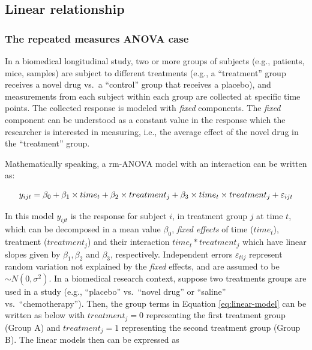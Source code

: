 \documentclass[
]{article}
\begin{document}
\hypertarget{linear-relationship}{%
\subsection{Linear relationship}\label{linear-relationship}}

\hypertarget{the-repeated-measures-anova-case}{%
\subsubsection{The repeated measures ANOVA case}\label{the-repeated-measures-anova-case}}

In a biomedical longitudinal study, two or more groups of subjects (e.g., patients, mice, samples) are subject to different treatments (e.g., a ``treatment'' group receives a novel drug vs.~a ``control'' group that receives a placebo), and measurements from each subject within each group are collected at specific time points. The collected response is modeled with \emph{fixed} components. The \emph{fixed} component can be understood as a constant value in the response which the researcher is interested in measuring, i.e., the average effect of the novel drug in the ``treatment'' group.

Mathematically speaking, a rm-ANOVA model with an interaction can be written as:

\begin{equation}
y_{ijt} = \beta_0+\beta_1 \times time_{t} +\beta_2 \times treatment_{j} +\beta_3 \times time_{t}\times treatment_{j}+\varepsilon_{ijt}\\ 
\label{eq:linear-model}
\end{equation}

In this model \(y_{ijt}\) is the response for subject \(i\), in treatment group \(j\) at time \(t\), which can be decomposed in a mean value \(\beta_0\), \emph{fixed effects} of time (\(time_t\)), treatment (\(treatment_j\)) and their interaction \(time_t*treatment_j\) which have linear slopes given by \(\beta_1, \beta_2\) and \(\beta_3\), respectively. Independent errors \(\varepsilon_{tij}\) represent random variation not explained by the \emph{fixed} effects, and are assumed to be \(\sim N(0,\sigma^2)\).
In a biomedical research context, suppose two treatments groups are used in a study (e.g., ``placebo'' vs.~``novel drug'' or ``saline'' vs.~``chemotherapy''). Then, the group terms in Equation \eqref{eq:linear-model} can be written as below with \(treatment_j=0\) representing the first treatment group (Group A) and \(treatment_j=1\) representing the second treatment group (Group B). The linear models then can be expressed as
\end{document}
